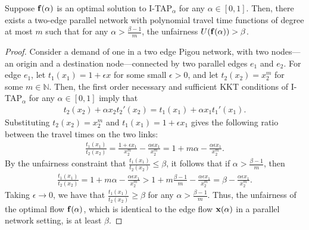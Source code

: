 \documentclass{article}
\begin{document}
\begin{lemma}  \label{lem:unfairness-tight}
Suppose $\mathbf{f}(\alpha)$ is an optimal solution to I-TAP$_{\alpha}$ for any $\alpha \in [0, 1]$. Then, there exists a two-edge parallel network with polynomial travel time functions of degree at most $m$ such that for any $\alpha > \frac{\beta-1}{m}$, the unfairness $U(\mathbf{f}(\alpha)) > \beta$.
\end{lemma}
\begin{proof}
Consider a demand of one in a two edge Pigou network, with two nodes---an origin and a destination node---connected by two parallel edges $e_1$ and $e_2$. For edge $e_1$, let $t_1(x_1) = 1 + \epsilon x$ for some small $\epsilon>0$, and let $t_2(x_2) = x_2^m$ for some $m \in \mathbb{N}$. Then, the first order necessary and sufficient KKT conditions of I-TAP$_{\alpha}$ for any $\alpha \in [0, 1]$ imply that
\begin{align*}
    t_2(x_2) + \alpha x_2 t_2'(x_2) = t_1(x_1) + \alpha x_1 t_1'(x_1).
\end{align*}
Substituting $t_2(x_2) = x_2^m$ and $t_1(x_1) = 1+ \epsilon x_1$ gives the following ratio between the travel times on the two links:
\begin{align*}
    \frac{t_1(x_1)}{t_2(x_2)} = \frac{1 + \epsilon x_1}{x_2^{m}} - \frac{\alpha \epsilon x_1}{x_2^m} = 1+m \alpha - \frac{\alpha \epsilon x_1}{x_2^m}.
\end{align*}
By the unfairness constraint that $\frac{t_1(x_1)}{t_2(x_2)} \leq \beta$, it follows that if $\alpha>\frac{\beta - 1}{m}$, then
\begin{align*}
    \frac{t_1(x_1)}{t_2(x_2)} = 1+m \alpha - \frac{\alpha \epsilon x_1}{x_2^m} > 1+m\frac{\beta - 1}{m} - \frac{\alpha \epsilon x_1}{x_2^m} = \beta - \frac{\alpha \epsilon x_1}{x_2^m}.
\end{align*}
Taking $\epsilon \rightarrow 0$, we have that $\frac{t_1(x_1)}{t_2(x_2)} \geq \beta$ for any $\alpha > \frac{\beta-1}{m}$. Thus, the unfairness of the optimal flow $\mathbf{f}(\alpha)$, which is identical to the edge flow $\mathbf{x}(\alpha)$ in a parallel network setting, is at least $\beta$.%
\end{proof}
\end{document}
